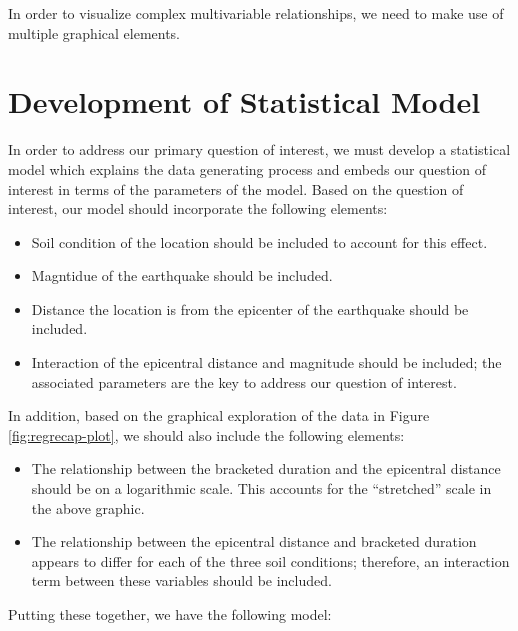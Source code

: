 \documentclass[]{book}
\providecommand{\tightlist}{%
  \setlength{\itemsep}{0pt}\setlength{\parskip}{0pt}}
\theoremstyle{plain}
\theoremstyle{mydefn}
\theoremstyle{myexmpl}
\theoremstyle{remark}
\begin{document}
In order to visualize complex multivariable relationships, we need to
make use of multiple graphical elements.

\section{Development of Statistical
Model}\label{development-of-statistical-model}

In order to address our primary question of interest, we must develop a
statistical model which explains the data generating process and embeds
our question of interest in terms of the parameters of the model. Based
on the question of interest, our model should incorporate the following
elements:

\begin{itemize}
\tightlist
\item
  Soil condition of the location should be included to account for this
  effect.
\item
  Magntidue of the earthquake should be included.
\item
  Distance the location is from the epicenter of the earthquake should
  be included.
\item
  Interaction of the epicentral distance and magnitude should be
  included; the associated parameters are the key to address our
  question of interest.
\end{itemize}

In addition, based on the graphical exploration of the data in Figure
\ref{fig:regrecap-plot}, we should also include the following elements:

\begin{itemize}
\tightlist
\item
  The relationship between the bracketed duration and the epicentral
  distance should be on a logarithmic scale. This accounts for the
  ``stretched'' scale in the above graphic.
\item
  The relationship between the epicentral distance and bracketed
  duration appears to differ for each of the three soil conditions;
  therefore, an interaction term between these variables should be
  included.
\end{itemize}

Putting these together, we have the following model:
\end{document}
